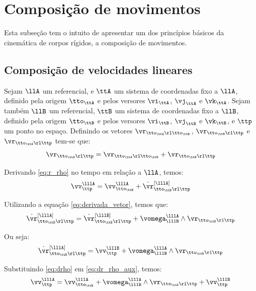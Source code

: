 \documentclass[]{politex}
\begin{document}
\section{Composição de movimentos}

Esta subseção tem o intuito de apresentar um dos princípios básicos da cinemática de corpos rígidos, a composição de movimentos.

\subsection{Composição de velocidades lineares}

Sejam $\llA$ um referencial, e $\ttA$ um sistema de coordenadas fixo a $\llA$, definido pela origem $\tto_\ttA$ e pelos versores $\vi_\ttA$, $\vj_\ttA$ e $\vk_\ttA$. Sejam também $\llB$ um referencial, $\ttB$ um sistema de coordenadas fixo a $\llB$, definido pela origem $\tto_\ttB$ e pelos versores $\vi_\ttB$, $\vj_\ttB$ e $\vk_\ttB$, e $\ttp$ um ponto no espaço. Definindo os vetores $\vr_{\tto_\ttA \rl \tto_\ttB}$, $\vr_{\tto_\ttB \rl \ttp}$ e $\vr_{\tto_\ttA \rl \ttp}$ tem-se que:
\begin{equation} \label{eq:r_rho}
\vr_{\tto_\ttA \rl \ttp} = \vr_{\tto_\ttA \rl \tto_\ttB} + \vr_{\tto_\ttB \rl \ttp}
\end{equation}

Derivando \eqref{eq:r_rho} no tempo em relação a $\llA$, temos:
\begin{equation} \label{eq:dr_rho_aux}
\vv_\ttp^{\lllA} = \vv_{\tto_\ttB}^{\lllA} + \dot{\vr}_{\tto_\ttB \rl \ttp}^{[\lllA]}
\end{equation}

Utilizando a equação \eqref{eq:derivada_vetor}, temos que:
\begin{equation} 
\dot{\vr}_{\tto_\ttB \rl \ttp}^{[\lllA]} = \dot{\vr}_{\tto_\ttB \rl \ttp}^{[\lllB]} + \vomega_{\lllB}^{\lllA}  \wedge  \vr_{\tto_\ttB \rl \ttp} 
\end{equation}


Ou seja:
\begin{equation} \label{eq:drho}
\dot{\vr}_{\tto_\ttB \rl \ttp}^{[\lllA]} =   \vv_\ttp^{\lllB} + \vomega_{\lllB}^{\lllA} \wedge \vr_{\tto_\ttB \rl \ttp} 
\end{equation}

Substituindo \eqref{eq:drho} em \eqref{eq:dr_rho_aux}, temos:
\begin{equation} \label{eq:dr_rho}
\vv_\ttp^{\lllA} = \vv_{\tto_\ttB}^{\lllA}  + \vomega_{\lllB}^{\lllA} \wedge \vr_{\tto_\ttB \rl \ttp}  + \vv_\ttp^{\lllB}
\end{equation}
\end{document}
